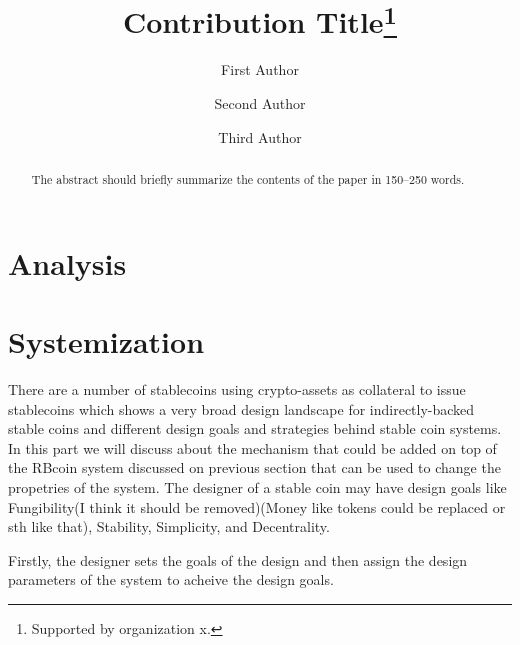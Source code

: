 \documentclass[runningheads]{llncs}
\begin{document}
%
\title{Contribution Title\thanks{Supported by organization x.}}
%
%
\author{First Author \and
Second Author \and
Third Author}
%
%
%
\maketitle              %
%
\begin{abstract}
The abstract should briefly summarize the contents of the paper in
150--250 words.

\end{abstract}
%
%
%
\section{Analysis}

\section{Systemization}
There are a number of stablecoins using crypto-assets as collateral to issue stablecoins which shows a very broad design landscape for indirectly-backed stable coins and different design goals and strategies behind stable coin systems. In this part we will discuss about the mechanism that could be added on top of the RBcoin system discussed on previous section that can be used to change the propetries of the system. The designer of a stable coin may have design goals like Fungibility(I think it should be removed)(Money like tokens could be replaced or sth like that), Stability, Simplicity, and Decentrality. 

Firstly, the designer sets the goals of the design and then assign the design parameters of the system to acheive the design goals.
\end{document}
